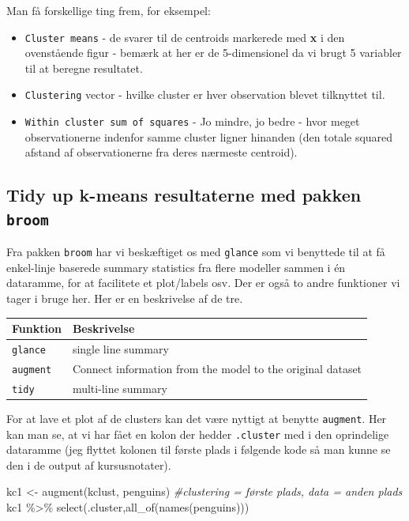 \documentclass[
]{book}
\newenvironment{Shaded}{\begin{snugshade}}{\end{snugshade}}
\newcommand{\CommentTok}[1]{\textcolor[rgb]{0.56,0.35,0.01}{\textit{#1}}}
\newcommand{\FunctionTok}[1]{\textcolor[rgb]{0.00,0.00,0.00}{#1}}
\newcommand{\NormalTok}[1]{#1}
\newcommand{\OtherTok}[1]{\textcolor[rgb]{0.56,0.35,0.01}{#1}}
\newcommand{\SpecialCharTok}[1]{\textcolor[rgb]{0.00,0.00,0.00}{#1}}
\providecommand{\tightlist}{%
  \setlength{\itemsep}{0pt}\setlength{\parskip}{0pt}}
\begin{document}
Man få forskellige ting frem, for eksempel:

\begin{itemize}
\tightlist
\item
  \texttt{Cluster\ means} - de svarer til de centroids markerede med \textbf{x} i den ovenstående figur - bemærk at her er de 5-dimensionel da vi brugt 5 variabler til at beregne resultatet.
\item
  \texttt{Clustering} vector - hvilke cluster er hver observation blevet tilknyttet til.
\item
  \texttt{Within\ cluster\ sum\ of\ squares} - Jo mindre, jo bedre - hvor meget observationerne indenfor samme cluster ligner hinanden (den totale squared afstand af observationerne fra deres nærmeste centroid).
\end{itemize}

\hypertarget{tidy-up-k-means-resultaterne-med-pakken-broom}{%
\subsection{\texorpdfstring{Tidy up k-means resultaterne med pakken \texttt{broom}}{Tidy up k-means resultaterne med pakken broom}}\label{tidy-up-k-means-resultaterne-med-pakken-broom}}

Fra pakken \texttt{broom} har vi beskæftiget os med \texttt{glance} som vi benyttede til at få enkel-linje baserede summary statistics fra flere modeller sammen i én dataramme, for at facilitete et plot/labels osv. Der er også to andre funktioner vi tager i bruge her. Her er en beskrivelse af de tre.

\begin{longtable}[]{@{}ll@{}}
\toprule
Funktion & Beskrivelse \\
\midrule
\endhead
\texttt{glance} & single line summary \\
\texttt{augment} & Connect information from the model to the original dataset \\
\texttt{tidy} & multi-line summary \\
\bottomrule
\end{longtable}

For at lave et plot af de clusters kan det være nyttigt at benytte \texttt{augment}. Her kan man se, at vi har fået en kolon der hedder \texttt{.cluster} med i den oprindelige dataramme (jeg flyttet kolonen til første plads i følgende kode så man kunne se den i de output af kursusnotater).

\begin{Shaded}
\begin{Highlighting}[]
\NormalTok{kc1 }\OtherTok{\textless{}{-}} \FunctionTok{augment}\NormalTok{(kclust, penguins) }\CommentTok{\#clustering = første plads, data = anden plads}
\NormalTok{kc1 }\SpecialCharTok{\%\textgreater{}\%} \FunctionTok{select}\NormalTok{(.cluster,}\FunctionTok{all\_of}\NormalTok{(}\FunctionTok{names}\NormalTok{(penguins)))}
\end{Highlighting}
\end{Shaded}
\end{document}
